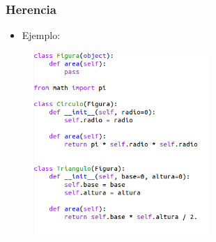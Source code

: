 \begin{frame}[fragile]
  \frametitle{Herencia}
  
  \begin{itemize}
  \item{Ejemplo:}
  \end{itemize}
  
  
  \begin{figure}
    \includegraphics[width=0.6\textwidth]{Imagenes/EjmH.png}
  \end{figure}
  
\end{frame}
